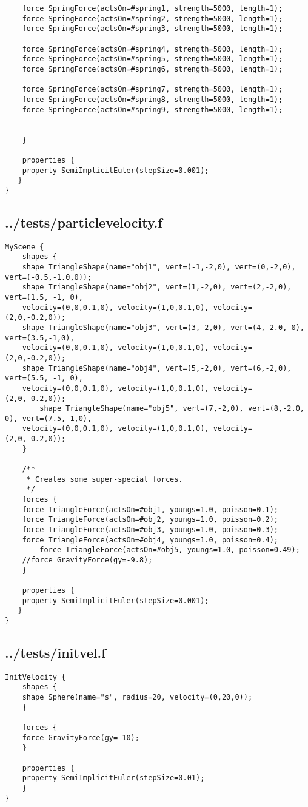 \begin{lstlisting}
	force SpringForce(actsOn=#spring1, strength=5000, length=1);
	force SpringForce(actsOn=#spring2, strength=5000, length=1);
	force SpringForce(actsOn=#spring3, strength=5000, length=1);

	force SpringForce(actsOn=#spring4, strength=5000, length=1);
	force SpringForce(actsOn=#spring5, strength=5000, length=1);
	force SpringForce(actsOn=#spring6, strength=5000, length=1);

	force SpringForce(actsOn=#spring7, strength=5000, length=1);
	force SpringForce(actsOn=#spring8, strength=5000, length=1);
	force SpringForce(actsOn=#spring9, strength=5000, length=1);


    }

    properties { 
	property SemiImplicitEuler(stepSize=0.001);
   }
}
\end{lstlisting}

\subsection*{../tests/particlevelocity.f}
\begin{lstlisting}
MyScene {
    shapes {
	shape TriangleShape(name="obj1", vert=(-1,-2,0), vert=(0,-2,0), vert=(-0.5,-1.0,0));
	shape TriangleShape(name="obj2", vert=(1,-2,0), vert=(2,-2,0), vert=(1.5, -1, 0), 
	velocity=(0,0,0.1,0), velocity=(1,0,0.1,0), velocity=(2,0,-0.2,0));
	shape TriangleShape(name="obj3", vert=(3,-2,0), vert=(4,-2.0, 0), vert=(3.5,-1,0),
	velocity=(0,0,0.1,0), velocity=(1,0,0.1,0), velocity=(2,0,-0.2,0));
	shape TriangleShape(name="obj4", vert=(5,-2,0), vert=(6,-2,0), vert=(5.5, -1, 0),
	velocity=(0,0,0.1,0), velocity=(1,0,0.1,0), velocity=(2,0,-0.2,0));
        shape TriangleShape(name="obj5", vert=(7,-2,0), vert=(8,-2.0, 0), vert=(7.5,-1,0),
	velocity=(0,0,0.1,0), velocity=(1,0,0.1,0), velocity=(2,0,-0.2,0));
	}

    /**
     * Creates some super-special forces.
     */
    forces {
	force TriangleForce(actsOn=#obj1, youngs=1.0, poisson=0.1);
	force TriangleForce(actsOn=#obj2, youngs=1.0, poisson=0.2);
	force TriangleForce(actsOn=#obj3, youngs=1.0, poisson=0.3);
	force TriangleForce(actsOn=#obj4, youngs=1.0, poisson=0.4);
        force TriangleForce(actsOn=#obj5, youngs=1.0, poisson=0.49);
	//force GravityForce(gy=-9.8);
    }

    properties { 
	property SemiImplicitEuler(stepSize=0.001);
   }
}
\end{lstlisting}

\subsection*{../tests/initvel.f}
\begin{lstlisting}
InitVelocity {
    shapes {
	shape Sphere(name="s", radius=20, velocity=(0,20,0));
    }

    forces {
	force GravityForce(gy=-10);
    }

    properties {
	property SemiImplicitEuler(stepSize=0.01);
    }
}\end{lstlisting}

